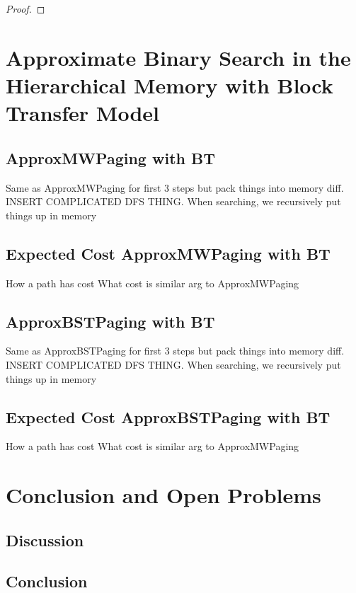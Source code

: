 \documentclass[letterpaper,12pt,titlepage,oneside,final]{book}
\theoremstyle{plain}
\begin{document}
\begin{proof}

\end{proof}


\chapter{Approximate Binary Search in the Hierarchical Memory with Block Transfer Model}

\section{ApproxMWPaging with BT}
Same as ApproxMWPaging for first 3 steps but pack things into memory diff. INSERT COMPLICATED DFS THING.
When searching, we recursively put things up in memory 

\section{Expected Cost ApproxMWPaging with BT}

How a path has cost
What cost is
similar arg to ApproxMWPaging


\section{ApproxBSTPaging with BT}
Same as ApproxBSTPaging for first 3 steps but pack things into memory diff. INSERT COMPLICATED DFS THING.
When searching, we recursively put things up in memory


\section{Expected Cost ApproxBSTPaging with BT}
How a path has cost
What cost is
similar arg to ApproxMWPaging

\chapter{Conclusion and Open Problems}

\section{Discussion}

\section{Conclusion}
\end{document}
